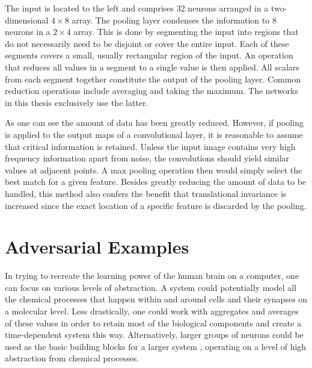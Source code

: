 \documentclass[11pt, a4paper]{article}
\begin{document}
The input is located to the left and comprises 32 neurons arranged in a two-dimensional $4 \times 8$ array. The pooling layer condenses the information to 8 neurons in a $2 \times 4$ array. This is done by segmenting the input into regions that do not necessarily need to be disjoint or cover the entire input. Each of these segments covers a small, usually rectangular region of the input. An operation that reduces all values in a segment to a single value is then applied. All scalars from each segment together constitute the output of the pooling layer. Common reduction operations include averaging and taking the maximum. The networks in this thesis exclusively use the latter.

As one can see the amount of data has been greatly reduced. However, if pooling is applied to the output maps of a convolutional layer, it is reasonable to assume that critical information is retained. Unless the input image contains very high frequency information apart from noise, the convolutions should yield similar values at adjacent points. A max pooling operation then would simply select the best match for a given feature. Besides greatly reducing the amount of data to be handled, this method also confers the benefit that translational invariance is increased since the exact location of a specific feature is discarded by the pooling.



\section{Adversarial Examples}
\label{sec:adversarial-examples}

In trying to recreate the learning power of the human brain on a computer, one can focus on various levels of abstraction. A system could potentially model all the chemical processes that happen within and around cells and their synapses on a molecular level. Less drastically, one could work with aggregates and averages of these values in order to retain most of the biological components and create a time-dependent system this way. Alternatively, larger groups of neurons could be used as the basic building blocks for a larger system \cite{dynamic-field-theory-movement-preparation}, operating on a level of high abstraction from chemical processes.
\end{document}
